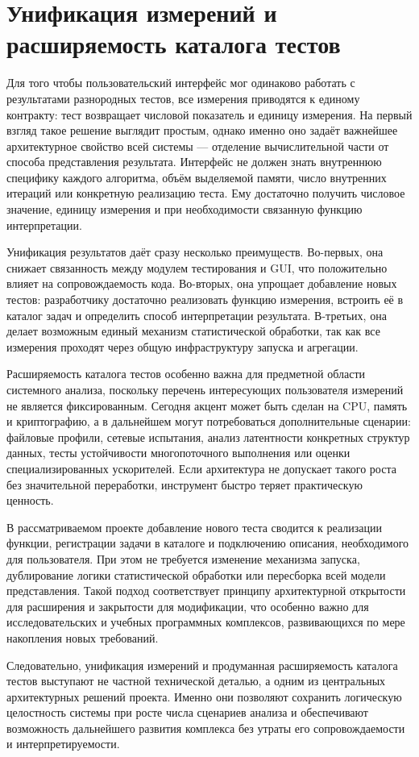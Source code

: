 \section{Унификация измерений и расширяемость каталога тестов}

Для того чтобы пользовательский интерфейс мог одинаково работать с результатами разнородных тестов, все измерения приводятся к единому контракту: тест возвращает числовой показатель и единицу измерения. На первый взгляд такое решение выглядит простым, однако именно оно задаёт важнейшее архитектурное свойство всей системы --- отделение вычислительной части от способа представления результата. Интерфейс не должен знать внутреннюю специфику каждого алгоритма, объём выделяемой памяти, число внутренних итераций или конкретную реализацию теста. Ему достаточно получить числовое значение, единицу измерения и при необходимости связанную функцию интерпретации.

Унификация результатов даёт сразу несколько преимуществ. Во-первых, она снижает связанность между модулем тестирования и GUI, что положительно влияет на сопровождаемость кода. Во-вторых, она упрощает добавление новых тестов: разработчику достаточно реализовать функцию измерения, встроить её в каталог задач и определить способ интерпретации результата. В-третьих, она делает возможным единый механизм статистической обработки, так как все измерения проходят через общую инфраструктуру запуска и агрегации.

Расширяемость каталога тестов особенно важна для предметной области системного анализа, поскольку перечень интересующих пользователя измерений не является фиксированным. Сегодня акцент может быть сделан на CPU, память и криптографию, а в дальнейшем могут потребоваться дополнительные сценарии: файловые профили, сетевые испытания, анализ латентности конкретных структур данных, тесты устойчивости многопоточного выполнения или оценки специализированных ускорителей. Если архитектура не допускает такого роста без значительной переработки, инструмент быстро теряет практическую ценность.

В рассматриваемом проекте добавление нового теста сводится к реализации функции, регистрации задачи в каталоге и подключению описания, необходимого для пользователя. При этом не требуется изменение механизма запуска, дублирование логики статистической обработки или пересборка всей модели представления. Такой подход соответствует принципу архитектурной открытости для расширения и закрытости для модификации, что особенно важно для исследовательских и учебных программных комплексов, развивающихся по мере накопления новых требований.

Следовательно, унификация измерений и продуманная расширяемость каталога тестов выступают не частной технической деталью, а одним из центральных архитектурных решений проекта. Именно они позволяют сохранить логическую целостность системы при росте числа сценариев анализа и обеспечивают возможность дальнейшего развития комплекса без утраты его сопровождаемости и интерпретируемости.
